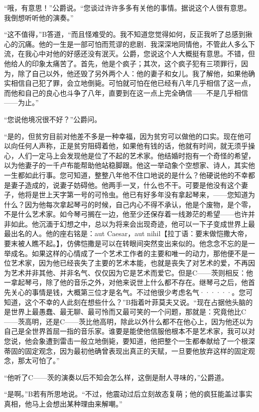 \documentclass[12pt, UTF8]{ctexbook}
\begin{document}
\par “哦，有意思！”公爵说。“您谈过许许多多有关他的事情。据说这个人很有意思。我倒想听听他的演奏。”
\par “这不值得，”B答道，“而且怪难受的。我不知道您觉得如何，反正我听了总感到揪心的沉痛。他的一生是一部可怕而荒谬的悲剧．我深深地同情他，不管此人多么下流，在我心中对他的好感还没有泯灭。公爵，您说这个人大概挺有意思。不错，但他给人的印象太痛苦了。首先，他是个疯子；其次，这个疯子犯有三项罪行，因为，除了自己以外，他还毁了另外两个人：他的妻子和女儿。我了解他，如果他确实相信自己犯了罪，会立地倒毙。可怕就可怕在他已经有八年几乎相信了这一点，而他和自己的良心也斗争了八年，直要到在这一点上完全确信——不是几乎相信——为止。”
\par “您说他境况很不好？”公爵问。
\par “是的，但贫穷目前对他差不多是一种幸福，因为贫穷可以做他的口实。现在他可以向任何人声称，正是贫穷阻碍着他，如果他有钱的话，他就有时间，就无须乎操心，人们一定马上会发现他是位了不起的艺术家。他结婚时抱有一个奇怪的希望，以为他妻子的一千卢布能帮助他站稳脚跟。他这一举动象个空想家、诗人，其实他一生都如此行事。您可知道，整整八年他不住口地说的是什么？他硬说他的不幸都是妻子造成的，说妻子妨碍他。他两手一叉，什么也不干。可要是他没有这个妻子，他将是世上天字第一号的可怜虫。他已有好多年没有拿起琴来，——您知道为什么？因为他每次拿起琴弓的时候，自己内心不得不承认，他是个废物，是个零，不是什么艺术家。如今琴弓搁在一边，他至少还保存着一线渺茫的希望——也许并非如此。他沉湎于幻想之中，总以为将来会出现奇迹，他可以一下子变成世界上最最出名的人。他的座右铭是：aut Caesar，aut nihil【拉丁语：要末做恺撒大帝，要末被人瞧不起。】，仿佛恺撒是可以在转眼间突然变出来似的。他念念不忘的是一举成名。如果这样的心情成了一个艺术工作者的主要和唯一的动力，那他便不是一位艺术家，因为他已经丧失了主要的艺术本能，也就是丧失了对艺术的爱，不再因为艺术并非其他、并非名气、仅仅因为它是艺术而爱它。但是C——茨则相反：他一拿起琴弓，除了他的音乐之外，对他来说世上什么都不存在。继琴弓之后，他首先关心的事情是钱，大概第三位才是名气。不过他很少考虑名气······。您可知道，这个不幸的人此刻在想些什么？”B指着叶菲莫夫又说。“现在占据他头脑的是世界上最愚蠢、最无聊、最可怜而又最可笑的一个问题，那就是：究竟他比C——茨高明，还是C——茨比他高明，除此以外什么都不在他心上，因为他还以为自己是全世界首屈一指的音乐家。谁要是能使他信服他根本不是艺术家，我可以对您说，他会象遭到雷击一般立地倒毙，要知道，他把整个一生都奉献给了一个根深蒂固的固定观念，因为最初他确曾表现出真正的天赋，一旦要他放弃这样的固定观念，那太可怕了。”
\par “他听了C——茨的演奏以后不知会怎么样，这倒是耐人寻味的，”公爵道。
\par “是啊。”B若有所思地说。“不过，他震动过后立刻故态复萌；他的疯狂能盖过事实真相，他马上会想出某种理由来解嘲。”
\end{document}
